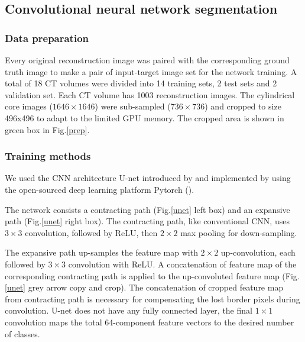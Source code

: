 \documentclass[draft,linenumbers]{agujournal2018}
\begin{document}
\subsection{Convolutional neural network segmentation}
\subsubsection{Data preparation}
Every original reconstruction image was paired with the corresponding ground truth image to make a pair of input-target image set for the network training. A total of 18 CT volumes were divided into 14 training sets, 2 test sets and 2 validation set. Each CT volume has 1003 reconstruction images. The cylindrical core images ($1646\times1646$) were sub-sampled ($736\times736$) and cropped to size 496x496 to adapt to the limited GPU memory. The cropped area is shown in green box in Fig.\ref{prep}.

\subsubsection{Training methods}
We used the CNN architecture U-net introduced by \citet{ronneberger2015u} and implemented by \citet{Jorispytorch} using the open-sourced deep learning platform Pytorch (\citet{paszke2017automatic}). 

The network consists a contracting path (Fig.\ref{unet} left box) and an expansive path (Fig.\ref{unet} right box). The contracting path, like conventional CNN, uses $3\times3$ convolution, followed by ReLU, then $2\times2$ max pooling for down-sampling. 

The expansive path up-samples the feature map with $2\times2$ up-convolution, each followed by $3\times3$ convolution with ReLU. A concatenation of feature map of the corresponding contracting path is applied to the up-convoluted feature map (Fig.\ref{unet} grey arrow copy and crop). The concatenation of cropped feature map from contracting path is necessary for compensating the lost border pixels during convolution. U-net does not have any fully connected layer, the final $1\times1$ convolution maps the total 64-component feature vectors to the desired number of classes. 
\end{document}
